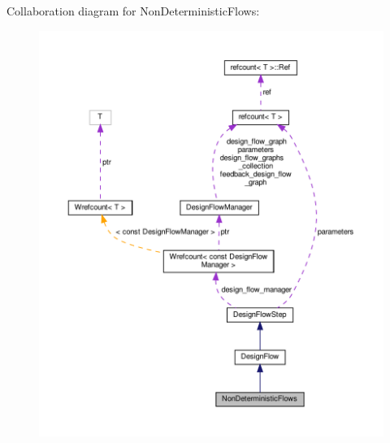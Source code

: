 Collaboration diagram for Non\+Deterministic\+Flows\+:
\nopagebreak
\begin{figure}[H]
\begin{center}
\leavevmode
\includegraphics[width=350pt]{dc/dbf/classNonDeterministicFlows__coll__graph}
\end{center}
\end{figure}
